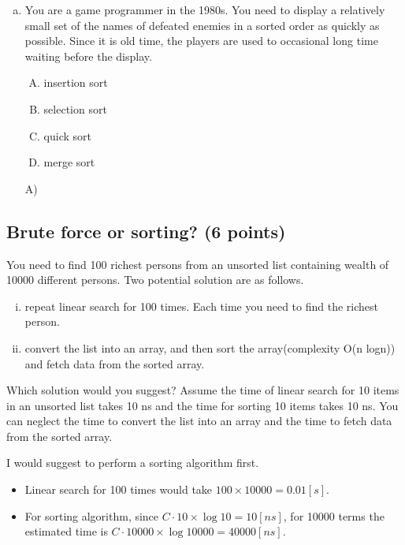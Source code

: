 \documentclass[11pt]{exam}
\begin{document}
\begin{enumerate}[(a)]
    \item You are a game programmer in the 1980s. You need to display a relatively small set of the names of defeated enemies in a sorted order as quickly as possible. Since it is old time, the players are used to occasional long time waiting before the display. 
    \begin{enumerate}[A)]
        \item insertion sort
        \item selection sort
        \item quick sort
        \item merge sort
    \end{enumerate}
    \begin{solution}
        A)
    \end{solution}
\end{enumerate}

\subsection{Brute force or sorting? (6 points)}
You need to find 100 richest persons from an unsorted list containing wealth of 10000 different persons. Two potential solution are as follows.
\begin{enumerate}[i)]
    \item repeat linear search for 100 times. Each time you need to find the richest person.
    \item convert the list into an array, and then sort the array(complexity O(n logn)) and fetch data from the sorted array.
\end{enumerate}
Which solution would you suggest? Assume the time of linear search for 10 items in an unsorted list takes 10 ns and the time for sorting 10 items takes 10 ns. You can neglect the time to convert the list into an array and the time to fetch data from the sorted array.

\begin{solution}
    I would suggest to perform a sorting algorithm first.
    \par 
    \begin{itemize}
        \item Linear search for 100 times would take $100 \times 10000 = 0.01 [s]$.
        \item For sorting algorithm, since $C\cdot 10 \times \log 10 = 10 [ns]$, for 10000 terms the 
        estimated time is $C \cdot 10000 \times \log 10000 = 40000[ns]$.
    \end{itemize}
\end{solution}
\end{document}
